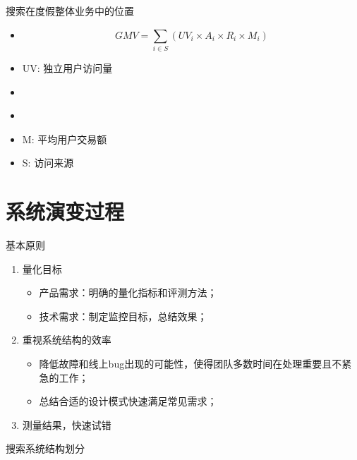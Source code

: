 \documentclass{beamer}
\begin{document}
\begin{CJK}{UTF8}{gbsn}
\begin{frame}{搜索在度假整体业务中的位置}
  \begin{itemize}
  \item { $$ GMV = \sum_{i \in S}{(UV_i \times A_i \times R_i \times M_i)} $$ }
  \item { UV: 独立用户访问量 }
  \item { \color{blue}{ A: 服务可用率 } }
  \item { \color{blue}{ R: UV至订单转化率 } }
  \item { M: 平均用户交易额 }
  \item { S: 访问来源 }
  \end{itemize}
\end{frame}

\section{系统演变过程}

\begin{frame}{基本原则}
  \begin{enumerate}
  \item {
    量化目标
    \begin{itemize}
    \item<2-> { 产品需求：明确的量化指标和评测方法； }
    \item<2-> { 技术需求：制定监控目标，总结效果； }
    \end{itemize}
  }
  \item {
    重视系统结构的效率
    \begin{itemize}
    \item<3-> { 降低故障和线上bug出现的可能性，使得团队多数时间在处理重要且不紧急的工作； }
    \item<3-> { 总结合适的设计模式快速满足常见需求； }
    \end{itemize}
  }
  \item {
    测量结果，快速试错
  }
  \end{enumerate}
\end{frame}

\begin{frame}{搜索系统结构划分}
  \newcommand{\suma}{\Large$+$}
  \newcommand{\inte}{$\displaystyle \int$}
  \newcommand{\derv}{\huge$\frac{d}{dt}$}


\end{frame}
\end{CJK}
\end{document}
